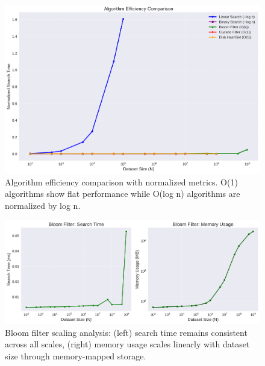 \documentclass[sigconf]{acmart}
\begin{document}
\begin{figure}[h]
\centering
\includegraphics[width=0.95\linewidth]{efficiency-comparison}
\caption{Algorithm efficiency comparison with normalized metrics. O(1) algorithms show flat performance while O(log n) algorithms are normalized by log n.}
\label{fig:efficiency-comparison}
\end{figure}

\begin{figure}[h]
\centering
\includegraphics[width=0.95\linewidth]{bloom-filter-scaling}
\caption{Bloom filter scaling analysis: (left) search time remains consistent across all scales, (right) memory usage scales linearly with dataset size through memory-mapped storage.}
\label{fig:bloom-scaling}
\end{figure}
\end{document}
